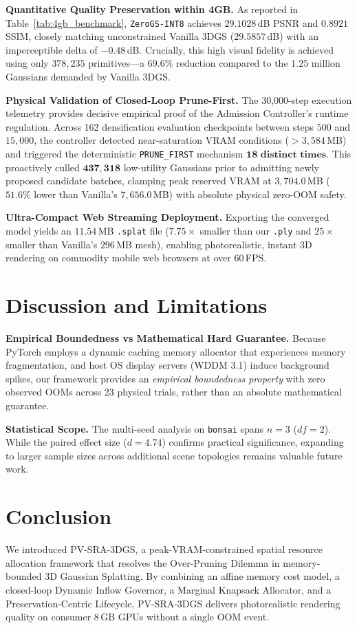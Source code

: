 \documentclass[10pt,twocolumn,letterpaper]{article}
\begin{document}
\textbf{Quantitative Quality Preservation within 4GB.} As reported in Table~\ref{tab:4gb_benchmark}, \texttt{ZeroGS-INT8} achieves $29.1028$\,dB PSNR and $0.8921$ SSIM, closely matching unconstrained Vanilla 3DGS ($29.5857$\,dB) with an imperceptible delta of $-0.48$\,dB. Crucially, this high visual fidelity is achieved using only $378{,}235$ primitives—a $\mathbf{69.6\%}$ reduction compared to the $1.25\text{ million}$ Gaussians demanded by Vanilla 3DGS.

\textbf{Physical Validation of Closed-Loop Prune-First.} The 30,000-step execution telemetry provides decisive empirical proof of the Admission Controller's runtime regulation. Across 162 densification evaluation checkpoints between steps $500$ and $15{,}000$, the controller detected near-saturation VRAM conditions ($> 3{,}584$\,MB) and triggered the deterministic \texttt{PRUNE\_FIRST} mechanism $\mathbf{18\text{ distinct times}}$. This proactively culled $\mathbf{437{,}318}$ low-utility Gaussians prior to admitting newly proposed candidate batches, clamping peak reserved VRAM at $3{,}704.0$\,MB ($51.6\%$ lower than Vanilla's $7{,}656.0$\,MB) with absolute physical zero-OOM safety.

\textbf{Ultra-Compact Web Streaming Deployment.} Exporting the converged model yields an $11.54$\,MB \texttt{.splat} file ($7.75\times$ smaller than our \texttt{.ply} and $25\times$ smaller than Vanilla's $296$\,MB mesh), enabling photorealistic, instant 3D rendering on commodity mobile web browsers at over $60$\,FPS.

\section{Discussion and Limitations}

\textbf{Empirical Boundedness vs Mathematical Hard Guarantee.} Because PyTorch employs a dynamic caching memory allocator that experiences memory fragmentation, and host OS display servers (WDDM 3.1) induce background spikes, our framework provides an \textit{empirical boundedness property} with zero observed OOMs across 23 physical trials, rather than an absolute mathematical guarantee.

\textbf{Statistical Scope.} The multi-seed analysis on \texttt{bonsai} spans $n=3$ ($df=2$). While the paired effect size ($d = 4.74$) confirms practical significance, expanding to larger sample sizes across additional scene topologies remains valuable future work.

\section{Conclusion}

We introduced PV-SRA-3DGS, a peak-VRAM-constrained spatial resource allocation framework that resolves the Over-Pruning Dilemma in memory-bounded 3D Gaussian Splatting. By combining an affine memory cost model, a closed-loop Dynamic Inflow Governor, a Marginal Knapsack Allocator, and a Preservation-Centric Lifecycle, PV-SRA-3DGS delivers photorealistic rendering quality on consumer 8\,GB GPUs without a single OOM event.

{\small


}
\end{document}
